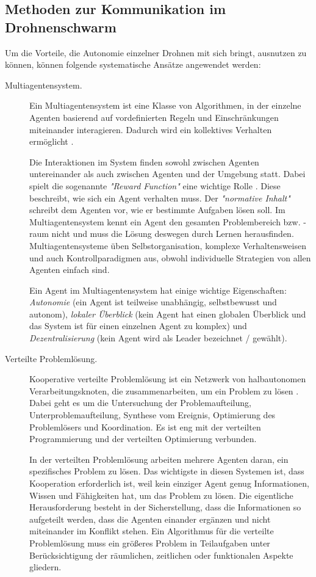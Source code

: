 \subsection{Methoden zur Kommunikation im Drohnenschwarm}

Um die Vorteile, die Autonomie einzelner Drohnen mit sich bringt, ausnutzen zu können, können folgende systematische Ansätze angewendet werden:

\begin{description} 
	\item[Multiagentensystem.] Ein Multiagentensystem ist eine Klasse von Algorithmen, in der einzelne Agenten basierend auf vordefinierten Regeln und Einschränkungen miteinander interagieren. Dadurch wird ein kollektives Verhalten ermöglicht \cite{Salamon2011}.
	
	Die Interaktionen im System finden sowohl zwischen Agenten untereinander als auch zwischen Agenten und der Umgebung statt. Dabei spielt die sogenannte \textit{"Reward Function"} eine wichtige Rolle \cite{Panait05cooperativemulti-agent}. Diese beschreibt, wie sich ein Agent verhalten muss. Der \textit{"normative Inhalt"} schreibt dem Agenten vor, wie er bestimmte Aufgaben lösen soll. Im Multiagentensystem kennt ein Agent den gesamten Problembereich bzw. -raum  nicht und muss die Lösung deswegen durch Lernen herausfinden. Multiagentensysteme üben Selbstorganisation, komplexe Verhaltensweisen und auch Kontrollparadigmen aus, obwohl individuelle Strategien von allen Agenten einfach sind.
	
	Ein Agent im Multiagentensystem hat einige wichtige Eigenschaften: \textit{Autonomie} (ein Agent ist teilweise unabhängig, selbstbewusst und autonom), \textit{lokaler Überblick} (kein Agent hat einen globalen Überblick und das System ist für einen einzelnen Agent zu komplex) und \textit{Dezentralisierung} (kein Agent wird als Leader bezeichnet / gewählt).
	
	\item[Verteilte Problemlösung.] Kooperative verteilte Problemlösung ist ein Netzwerk von halbautonomen Verarbeitungsknoten, die zusammenarbeiten, um ein Problem zu lösen \cite{Shoham:2009p113}. Dabei geht es um die Untersuchung der Problemaufteilung, Unterproblemaufteilung, Synthese vom Ereignis, Optimierung des Problemlösers und Koordination. Es ist eng mit der verteilten Programmierung und der verteilten Optimierung verbunden.
	
	In der verteilten Problemlösung arbeiten mehrere Agenten daran, ein spezifisches Problem zu lösen. Das wichtigste in diesen Systemen ist, dass Kooperation erforderlich ist, weil kein einziger Agent genug Informationen, Wissen und Fähigkeiten hat, um das Problem zu lösen. Die eigentliche Herausforderung besteht in der Sicherstellung, dass die Informationen so aufgeteilt werden, dass die Agenten einander ergänzen und nicht miteinander im Konflikt stehen. Ein Algorithmus für die verteilte Problemlösung muss ein größeres Problem in Teilaufgaben unter Berücksichtigung der räumlichen, zeitlichen oder funktionalen Aspekte gliedern.
	

\end{description}

